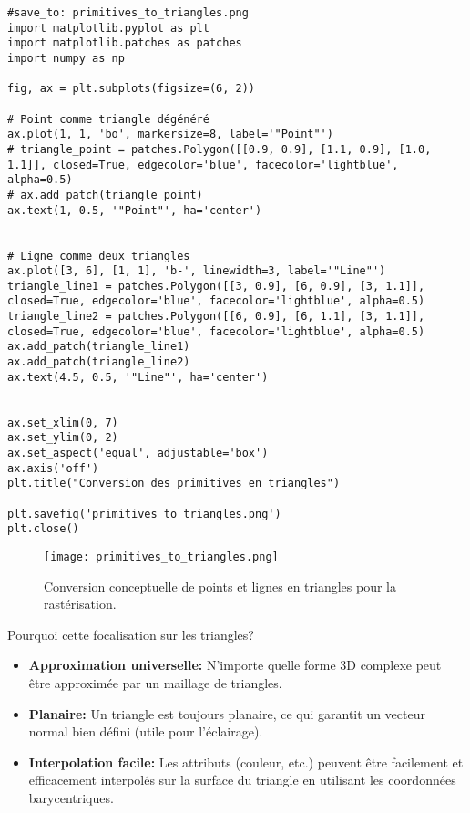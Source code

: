 \documentclass{article}
\begin{document}
\begin{verbatim}
#save_to: primitives_to_triangles.png
import matplotlib.pyplot as plt
import matplotlib.patches as patches
import numpy as np

fig, ax = plt.subplots(figsize=(6, 2))

# Point comme triangle dégénéré
ax.plot(1, 1, 'bo', markersize=8, label='"Point"')
# triangle_point = patches.Polygon([[0.9, 0.9], [1.1, 0.9], [1.0, 1.1]], closed=True, edgecolor='blue', facecolor='lightblue', alpha=0.5)
# ax.add_patch(triangle_point)
ax.text(1, 0.5, '"Point"', ha='center')


# Ligne comme deux triangles
ax.plot([3, 6], [1, 1], 'b-', linewidth=3, label='"Line"')
triangle_line1 = patches.Polygon([[3, 0.9], [6, 0.9], [3, 1.1]], closed=True, edgecolor='blue', facecolor='lightblue', alpha=0.5)
triangle_line2 = patches.Polygon([[6, 0.9], [6, 1.1], [3, 1.1]], closed=True, edgecolor='blue', facecolor='lightblue', alpha=0.5)
ax.add_patch(triangle_line1)
ax.add_patch(triangle_line2)
ax.text(4.5, 0.5, '"Line"', ha='center')


ax.set_xlim(0, 7)
ax.set_ylim(0, 2)
ax.set_aspect('equal', adjustable='box')
ax.axis('off')
plt.title("Conversion des primitives en triangles")

plt.savefig('primitives_to_triangles.png')
plt.close()
\end{verbatim}

\begin{figure}[H]
\centering
\texttt{[image: primitives\_to\_triangles.png]}
\caption{Conversion conceptuelle de points et lignes en triangles pour la rastérisation.}
\label{fig:primitives_to_triangles}
\end{figure}

Pourquoi cette focalisation sur les triangles?
\begin{itemize}
    \item \textbf{Approximation universelle:} N'importe quelle forme 3D complexe peut être approximée par un maillage de triangles.
    \item \textbf{Planaire:} Un triangle est toujours planaire, ce qui garantit un vecteur normal bien défini (utile pour l'éclairage).
    \item \textbf{Interpolation facile:} Les attributs (couleur, etc.) peuvent être facilement et efficacement interpolés sur la surface du triangle en utilisant les coordonnées barycentriques.
\end{itemize}
\end{document}
